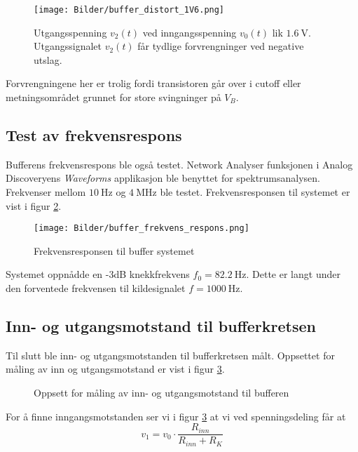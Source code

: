 \begin{figure}[H]
    \centering 
    \texttt{[image: Bilder/buffer\_distort\_1V6.png]}
    \caption{Utgangsspenning $v_2(t)$ ved inngangsspenning $v_0(t)$ lik $\SI{1.6}{\volt}$. Utgangssignalet $v_2(t)$ får tydlige 
    forvrengninger ved negative utslag.}
    \label{fig:buffer_disturb_850mv_plot}
\end{figure}

Forvrengningene her er trolig fordi transistoren går over i cutoff eller metningsområdet grunnet for store svingninger på 
$V_{B}$.

\subsection{Test av frekvensrespons}
Bufferens frekvensrespons ble også testet. Network Analyser funksjonen i 
Analog Discoveryens \textit{Waveforms} applikasjon ble benyttet for spektrumsanalysen. Frekvenser mellom
$\SI{10}{\hertz}$ og $\SI{4}{\mega\hertz}$ ble testet. Frekvensresponsen til systemet er vist i figur \ref{fig:buffer_frekvens_respons}.
\begin{figure}[H]
    \centering 
    \texttt{[image: Bilder/buffer\_frekvens\_respons.png]}
    \caption{Frekvensresponsen til buffer systemet}
    \label{fig:buffer_frekvens_respons}
\end{figure}

Systemet oppnådde en -3dB knekkfrekvens $f_0 = \SI{82.2}{\hertz}$. Dette er langt under den forventede 
frekvensen til kildesignalet $f = \SI{1000}{\hertz}$.

\subsection{Inn- og utgangsmotstand til bufferkretsen}
Til slutt ble inn- og utgangsmotstanden til bufferkretsen målt. Oppsettet for måling av inn og utgangsmotstand 
er vist i figur \ref{fig:in_out_res_measure_setup}.

\begin{figure}[H]
    \centering
    \caption{Oppsett for måling av inn- og utgangsmotstand til bufferen}
    \label{fig:in_out_res_measure_setup}
\end{figure}

For å finne inngangsmotstanden ser vi i figur \ref{fig:in_out_res_measure_setup} at vi ved spenningsdeling
får at 
\[
    v_1 = v_0 \cdot \frac{R_{inn}}{R_{inn} + R_K}
\]

